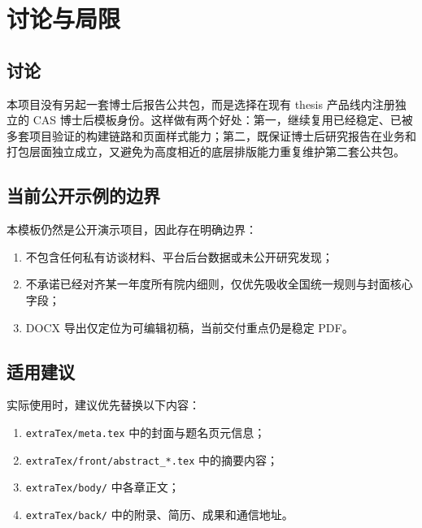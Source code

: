 \chapter{讨论与局限}

\section{讨论}

本项目没有另起一套博士后报告公共包，而是选择在现有 thesis 产品线内注册独立的 CAS 博士后模板身份。这样做有两个好处：第一，继续复用已经稳定、已被多套项目验证的构建链路和页面样式能力；第二，既保证博士后研究报告在业务和打包层面独立成立，又避免为高度相近的底层排版能力重复维护第二套公共包。

\section{当前公开示例的边界}

本模板仍然是公开演示项目，因此存在明确边界：

\begin{enumerate}
  \item 不包含任何私有访谈材料、平台后台数据或未公开研究发现；
  \item 不承诺已经对齐某一年度所有院内细则，仅优先吸收全国统一规则与封面核心字段；
  \item DOCX 导出仅定位为可编辑初稿，当前交付重点仍是稳定 PDF。
\end{enumerate}

\section{适用建议}

实际使用时，建议优先替换以下内容：

\begin{enumerate}
  \item \texttt{extraTex/meta.tex} 中的封面与题名页元信息；
  \item \texttt{extraTex/front/abstract\_*.tex} 中的摘要内容；
  \item \texttt{extraTex/body/} 中各章正文；
  \item \texttt{extraTex/back/} 中的附录、简历、成果和通信地址。
\end{enumerate}
